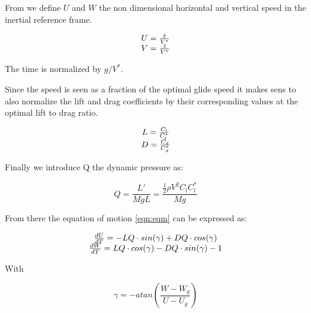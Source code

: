 \par From we define $U$ and $W$ the non dimensional horizontal and vertical speed in the inertial reference frame.

\begin{equation}
  \begin{array}[c]{c}
    U = \frac{\dot{x}}{V^*} \\
    V= \frac{\dot{z}}{V^*}
  \end{array}
  \label{eqn:non_dim_speed}
\end{equation}

The time is normalized by $g / V^*$.

\par Since the speed is seen as a fraction of the optimal glide speed it makes sens to also normalize the lift and drag coefficients by their corresponding values at the optimal lift to drag ratio.

\begin{equation}
  \begin{array}[c]{c}
    L= \frac{C_l}{C_l^*} \\
    D= \frac{C_d}{C_d^*} 
  \end{array}
  \label{eqn:non_dim_coef}
\end{equation}

\par Finally we introduce Q the dynamic pressure as:

\begin{equation}
  Q = \frac{L'}{MgL} = \frac{\frac{1}{2} \rho V^2 C_l C_l^* }{Mg}
  \label{eqn:dynamic_pressure}
\end{equation}

\par From there the equation of motion \ref{eqn:eqm} can be expressed as:

\begin{equation}
  \begin{array}[c]{c}
    \frac{dU}{dT}= -LQ \cdot sin(\gamma) + DQ \cdot cos(\gamma) \\ 
    \frac{dW}{dT}= LQ \cdot cos(\gamma) - DQ \cdot sin(\gamma) - 1
  \end{array}
  \label{eqn:non_dim_eqm}
\end{equation}

With 

\begin{equation}
  \gamma = -atan(\frac{W-W_g}{U-U_g})
  \label{eqn:gamma_def}
\end{equation}

